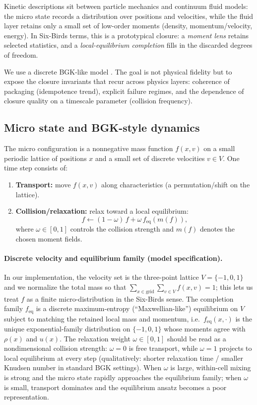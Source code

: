 \documentclass[11pt]{article}
\begin{document}
Kinetic descriptions sit between particle mechanics and continuum fluid models: the micro state records a distribution over positions and velocities, while the fluid layer retains only a small set of low-order moments (density, momentum/velocity, energy). In Six-Birds terms, this is a prototypical closure: a \emph{moment lens} retains selected statistics, and a \emph{local-equilibrium completion} fills in the discarded degrees of freedom.

We use a discrete BGK-like model \citep{bhatnagar1954bgk,cercignani1988,levermore1996}. The goal is not physical fidelity but to expose the closure invariants that recur across physics layers: coherence of packaging (idempotence trend), explicit failure regimes, and the dependence of closure quality on a timescale parameter (collision frequency).

\subsection{Micro state and BGK-style dynamics}
The micro configuration is a nonnegative mass function $f(x,v)$ on a small periodic lattice of positions $x$ and a small set of discrete velocities $v\in V$. One time step consists of:
\begin{enumerate}
  \item \textbf{Transport:} move $f(x,v)$ along characteristics (a permutation/shift on the lattice).
  \item \textbf{Collision/relaxation:} relax toward a local equilibrium:
  \[
    f \leftarrow (1-\omega)\,f + \omega\,f_{\mathrm{eq}}(m(f)),
  \]
  where $\omega\in[0,1]$ controls the collision strength and $m(f)$ denotes the chosen moment fields.
\end{enumerate}
\paragraph{Discrete velocity and equilibrium family (model specification).}
In our implementation, the velocity set is the three-point lattice $V=\{-1,0,1\}$ and we normalize the total mass so that $\sum_{x\in\text{grid}}\sum_{v\in V} f(x,v)=1$; this lets us treat $f$ as a finite micro-distribution in the Six-Birds sense.
The completion family $f_{\mathrm{eq}}$ is a discrete maximum-entropy (``Maxwellian-like'') equilibrium on $V$ subject to matching the retained local mass and momentum, i.e.\ $f_{\mathrm{eq}}(x,\cdot)$ is the unique exponential-family distribution on $\{-1,0,1\}$ whose moments agree with $\rho(x)$ and $u(x)$.
The relaxation weight $\omega\in[0,1]$ should be read as a nondimensional collision strength: $\omega=0$ is free transport, while $\omega=1$ projects to local equilibrium at every step (qualitatively: shorter relaxation time / smaller Knudsen number in standard BGK settings).
When $\omega$ is large, within-cell mixing is strong and the micro state rapidly approaches the equilibrium family; when $\omega$ is small, transport dominates and the equilibrium ansatz becomes a poor representation.
\end{document}
